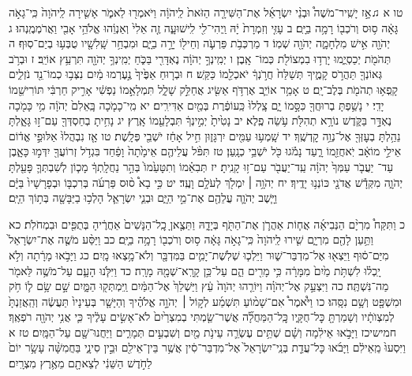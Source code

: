 \documentclass[twoside, openany, parskip=half, 11pt]{book}
\begin{document}
טו א ♫אָ֣ז יָשִֽׁיר־מֹשֶׁה֩ וּבְנֵ֨י יִשְׂרָאֵ֜ל אֶת־הַשִּׁירָ֤ה הַזֹּאת֙ לַֽיהֹוָ֔ה וַיֹּאמְר֖וּ
לֵאמֹ֑ר 	אָשִׁ֤ירָה לַֽיהֹוָה֙ כִּֽי־גָאֹ֣ה גָּאָ֔ה 	ס֥וּס
וְרֹכְב֖וֹ רָמָ֥ה בַיָּֽם׃ 	ב עָזִּ֤י וְזִמְרָת֙ יָ֔הּ וַֽיְהִי־לִ֖י
לִֽישׁוּעָ֑ה 	זֶ֤ה אֵלִי֙ וְאַנְוֵ֔הוּ 	אֱלֹהֵ֥י
אָבִ֖י וַאֲרֹמְמֶֽנְהוּ׃ 	ג יְהֹוָ֖ה אִ֣ישׁ מִלְחָמָ֑ה יְהֹוָ֖ה
שְׁמֽוֹ׃ 	ד מַרְכְּבֹ֥ת פַּרְעֹ֛ה וְחֵיל֖וֹ יָרָ֣ה בַיָּ֑ם 	וּמִבְחַ֥ר
שָֽׁלִשָׁ֖יו טֻבְּע֥וּ בְיַם־סֽוּף׃ 	ה תְּהֹמֹ֖ת יְכַסְיֻ֑מוּ יָרְד֥וּ בִמְצוֹלֹ֖ת כְּמוֹ־
אָֽבֶן׃ 	ו יְמִֽינְךָ֣ יְהֹוָ֔ה נֶאְדָּרִ֖י בַּכֹּ֑חַ 	יְמִֽינְךָ֥
יְהֹוָ֖ה תִּרְעַ֥ץ אוֹיֵֽב׃ 	ז וּבְרֹ֥ב גְּאוֹנְךָ֖ תַּהֲרֹ֣ס
קָמֶ֑יךָ 	תְּשַׁלַּח֙ חֲרֹ֣נְךָ֔ יֹאכְלֵ֖מוֹ כַּקַּֽשׁ׃ 	ח וּבְר֤וּחַ
אַפֶּ֙יךָ֙ נֶ֣עֶרְמוּ מַ֔יִם 	נִצְּב֥וּ כְמוֹ־נֵ֖ד
נֹזְלִ֑ים 	קָֽפְא֥וּ תְהֹמֹ֖ת בְּלֶב־יָֽם׃ 	ט אָמַ֥ר
אוֹיֵ֛ב אֶרְדֹּ֥ף אַשִּׂ֖יג 	אֲחַלֵּ֣ק שָׁלָ֑ל תִּמְלָאֵ֣מוֹ
נַפְשִׁ֔י 	אָרִ֣יק חַרְבִּ֔י תּוֹרִישֵׁ֖מוֹ יָדִֽי׃ 	י נָשַׁ֥פְתָּ
בְרוּחֲךָ֖ כִּסָּ֣מוֹ יָ֑ם 	צָֽלְלוּ֙ כַּֽעוֹפֶ֔רֶת בְּמַ֖יִם
אַדִּירִֽים׃ 	יא מִֽי־כָמֹ֤כָה בָּֽאֵלִם֙ יְהֹוָ֔ה 	מִ֥י
כָּמֹ֖כָה נֶאְדָּ֣ר בַּקֹּ֑דֶשׁ 	נוֹרָ֥א תְהִלֹּ֖ת עֹ֥שֵׂה
פֶֽלֶא׃ 	יב נָטִ֙יתָ֙ יְמִ֣ינְךָ֔ תִּבְלָעֵ֖מוֹ אָֽרֶץ׃ 	יג נָחִ֥יתָ
בְחַסְדְּךָ֖ עַם־ז֣וּ גָּאָ֑לְתָּ 	נֵהַ֥לְתָּ בְעׇזְּךָ֖ אֶל־נְוֵ֥ה
קׇדְשֶֽׁךָ׃ 	יד שָֽׁמְע֥וּ עַמִּ֖ים יִרְגָּז֑וּן 	חִ֣יל
אָחַ֔ז יֹשְׁבֵ֖י פְּלָֽשֶׁת׃ 	טו אָ֤ז נִבְהֲלוּ֙ אַלּוּפֵ֣י
אֱד֔וֹם 	אֵילֵ֣י מוֹאָ֔ב יֹֽאחֲזֵ֖מוֹ רָ֑עַד 	נָמֹ֕גוּ
כֹּ֖ל יֹשְׁבֵ֥י כְנָֽעַן׃ 	טז תִּפֹּ֨ל עֲלֵיהֶ֤ם אֵימָ֙תָה֙
וָפַ֔חַד 	בִּגְדֹ֥ל זְרוֹעֲךָ֖ יִדְּמ֣וּ כָּאָ֑בֶן 	עַד־
יַעֲבֹ֤ר עַמְּךָ֙ יְהֹוָ֔ה 	עַֽד־יַעֲבֹ֖ר עַם־ז֥וּ
קָנִֽיתָ׃ 	יז תְּבִאֵ֗מוֹ וְתִטָּעֵ֙מוֹ֙ בְּהַ֣ר נַחֲלָֽתְךָ֔ 	מָכ֧וֹן
לְשִׁבְתְּךָ֛ פָּעַ֖לְתָּ יְהֹוָ֑ה 	מִקְּדָ֕שׁ אֲדֹנָ֖י כּוֹנְנ֥וּ
יָדֶֽיךָ׃ 	יח יְהֹוָ֥ה ׀ יִמְלֹ֖ךְ לְעֹלָ֥ם וָעֶֽד׃ 	יט כִּ֣י
בָא֩ ס֨וּס פַּרְעֹ֜ה בְּרִכְבּ֤וֹ וּבְפָרָשָׁיו֙ בַּיָּ֔ם 	וַיָּ֧שֶׁב יְהֹוָ֛ה עֲלֵהֶ֖ם
אֶת־מֵ֣י הַיָּ֑ם 	וּבְנֵ֧י יִשְׂרָאֵ֛ל הָלְכ֥וּ בַיַּבָּשָׁ֖ה בְּת֥וֹךְ הַיָּֽם׃

כ וַתִּקַּח֩ מִרְיָ֨ם הַנְּבִיאָ֜ה אֲח֧וֹת אַהֲרֹ֛ן אֶת־הַתֹּ֖ף בְּיָדָ֑הּ וַתֵּצֶ֤אןָ כׇֽל־הַנָּשִׁים֙ אַחֲרֶ֔יהָ בְּתֻפִּ֖ים וּבִמְחֹלֹֽת׃ כא וַתַּ֥עַן לָהֶ֖ם מִרְיָ֑ם שִׁ֤ירוּ לַֽיהֹוָה֙ כִּֽי־גָאֹ֣ה גָּאָ֔ה ס֥וּס וְרֹכְב֖וֹ רָמָ֥ה בַיָּֽם׃
כב וַיַּסַּ֨ע מֹשֶׁ֤ה אֶת־יִשְׂרָאֵל֙ מִיַּם־ס֔וּף וַיֵּצְא֖וּ אֶל־מִדְבַּר־שׁ֑וּר וַיֵּלְכ֧וּ שְׁלֹֽשֶׁת־יָמִ֛ים בַּמִּדְבָּ֖ר וְלֹא־מָ֥צְאוּ מָֽיִם׃ כג וַיָּבֹ֣אוּ מָרָ֔תָה וְלֹ֣א יָֽכְל֗וּ לִשְׁתֹּ֥ת מַ֙יִם֙ מִמָּרָ֔ה כִּ֥י מָרִ֖ים הֵ֑ם עַל־כֵּ֥ן קָרָֽא־שְׁמָ֖הּ מָרָֽה׃ כד וַיִּלֹּ֧נוּ הָעָ֛ם עַל־מֹשֶׁ֥ה לֵּאמֹ֖ר מַה־נִּשְׁתֶּֽה׃ כה וַיִּצְעַ֣ק אֶל־יְהֹוָ֗ה וַיּוֹרֵ֤הוּ יְהֹוָה֙ עֵ֔ץ וַיַּשְׁלֵךְ֙ אֶל־הַמַּ֔יִם וַֽיִּמְתְּק֖וּ הַמָּ֑יִם שָׁ֣ם שָׂ֥ם ל֛וֹ חֹ֥ק וּמִשְׁפָּ֖ט וְשָׁ֥ם נִסָּֽהוּ׃ כו וַיֹּ֩אמֶר֩ אִם־שָׁמ֨וֹעַ תִּשְׁמַ֜ע לְק֣וֹל ׀ יְהֹוָ֣ה אֱלֹהֶ֗יךָ וְהַיָּשָׁ֤ר בְּעֵינָיו֙ תַּעֲשֶׂ֔ה וְהַֽאֲזַנְתָּ֙ לְמִצְוֺתָ֔יו וְשָׁמַרְתָּ֖ כׇּל־חֻקָּ֑יו כׇּֽל־הַמַּחֲלָ֞ה אֲשֶׁר־שַׂ֤מְתִּי בְמִצְרַ֙יִם֙ לֹא־אָשִׂ֣ים עָלֶ֔יךָ כִּ֛י אֲנִ֥י יְהֹוָ֖ה רֹפְאֶֽךָ׃
חמישיכז וַיָּבֹ֣אוּ אֵילִ֔מָה וְשָׁ֗ם שְׁתֵּ֥ים עֶשְׂרֵ֛ה עֵינֹ֥ת מַ֖יִם וְשִׁבְעִ֣ים תְּמָרִ֑ים וַיַּחֲנוּ־שָׁ֖ם עַל־הַמָּֽיִם׃ טז א וַיִּסְעוּ֙ מֵֽאֵילִ֔ם וַיָּבֹ֜אוּ כׇּל־עֲדַ֤ת בְּנֵֽי־יִשְׂרָאֵל֙ אֶל־מִדְבַּר־סִ֔ין אֲשֶׁ֥ר בֵּין־אֵילִ֖ם וּבֵ֣ין סִינָ֑י בַּחֲמִשָּׁ֨ה עָשָׂ֥ר יוֹם֙ לַחֹ֣דֶשׁ הַשֵּׁנִ֔י לְצֵאתָ֖ם מֵאֶ֥רֶץ מִצְרָֽיִם׃
\end{document}
